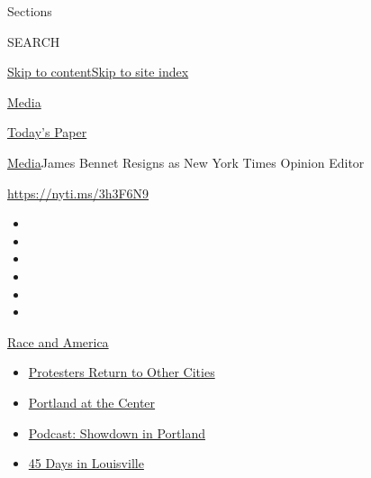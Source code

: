 Sections

SEARCH

\protect\hyperlink{site-content}{Skip to
content}\protect\hyperlink{site-index}{Skip to site index}

\href{https://www.nytimes3xbfgragh.onion/section/business/media}{Media}

\href{https://myaccount.nytimes3xbfgragh.onion/auth/login?response_type=cookie\&client_id=vi}{}

\href{https://www.nytimes3xbfgragh.onion/section/todayspaper}{Today's
Paper}

\href{/section/business/media}{Media}\textbar{}James Bennet Resigns as
New York Times Opinion Editor

\url{https://nyti.ms/3h3F6N9}

\begin{itemize}
\item
\item
\item
\item
\item
\item
\end{itemize}

\href{https://www.nytimes3xbfgragh.onion/news-event/george-floyd-protests-minneapolis-new-york-los-angeles?action=click\&pgtype=Article\&state=default\&region=TOP_BANNER\&context=storylines_menu}{Race
and America}

\begin{itemize}
\tightlist
\item
  \href{https://www.nytimes3xbfgragh.onion/2020/07/26/us/protests-portland-seattle-trump.html?action=click\&pgtype=Article\&state=default\&region=TOP_BANNER\&context=storylines_menu}{Protesters
  Return to Other Cities}
\item
  \href{https://www.nytimes3xbfgragh.onion/2020/07/24/us/portland-oregon-protests-white-race.html?action=click\&pgtype=Article\&state=default\&region=TOP_BANNER\&context=storylines_menu}{Portland
  at the Center}
\item
  \href{https://www.nytimes3xbfgragh.onion/2020/07/23/podcasts/the-daily/portland-protests.html?action=click\&pgtype=Article\&state=default\&region=TOP_BANNER\&context=storylines_menu}{Podcast:
  Showdown in Portland}
\item
  \href{https://www.nytimes3xbfgragh.onion/interactive/2020/07/16/us/black-lives-matter-protests-louisville-breonna-taylor.html?action=click\&pgtype=Article\&state=default\&region=TOP_BANNER\&context=storylines_menu}{45
  Days in Louisville}
\end{itemize}

